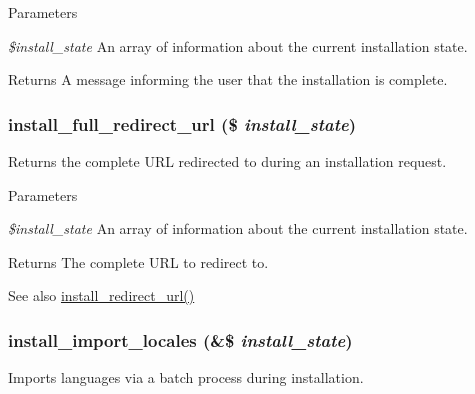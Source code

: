 \begin{DoxyParams}{Parameters}
\item[{\em \$install\_\-state}]An array of information about the current installation state.\end{DoxyParams}
\begin{DoxyReturn}{Returns}
A message informing the user that the installation is complete. 
\end{DoxyReturn}
\hypertarget{install_8core_8inc_a562ee3011859e71bb87c068340ce6dc6}{
\subsubsection[{install\_\-full\_\-redirect\_\-url}]{\setlength{\rightskip}{0pt plus 5cm}install\_\-full\_\-redirect\_\-url (\$ {\em install\_\-state})}}
\label{install_8core_8inc_a562ee3011859e71bb87c068340ce6dc6}
Returns the complete URL redirected to during an installation request.


\begin{DoxyParams}{Parameters}
\item[{\em \$install\_\-state}]An array of information about the current installation state.\end{DoxyParams}
\begin{DoxyReturn}{Returns}
The complete URL to redirect to.
\end{DoxyReturn}
\begin{DoxySeeAlso}{See also}
\hyperlink{install_8core_8inc_a6653d055f5af1ec01fa9769b41f747b5}{install\_\-redirect\_\-url()} 
\end{DoxySeeAlso}
\hypertarget{install_8core_8inc_a8736de2cc75cff24bc4b070668526dde}{
\subsubsection[{install\_\-import\_\-locales}]{\setlength{\rightskip}{0pt plus 5cm}install\_\-import\_\-locales (\&\$ {\em install\_\-state})}}
\label{install_8core_8inc_a8736de2cc75cff24bc4b070668526dde}
Imports languages via a batch process during installation.


